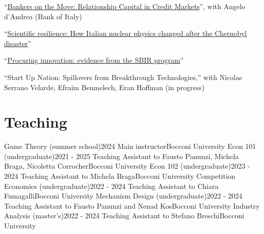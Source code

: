 \documentclass[A4,11pt]{article}
\newcommand{\CVSubHeadingListStart}{\begin{itemize}[leftmargin=0.5cm, label={}]}
\newcommand{\CVSubHeadingListEnd}{\end{itemize}}
\begin{document}
\begin{list}{}{\setlength{\leftmargin}{12pt}}
	\item ``\href{https://enrico-stivella.netlify.app/publication/bankersrelocation/}{Bankers on the Move: Relationship Capital in Credit Markets}'', with Angelo d'Andrea (Bank of Italy) \\
	\item ``\href{https://enrico-stivella.netlify.app/publication/nuclearscience/}{Scientific resilience: How Italian nuclear physics changed after the Chernobyl disaster}'' \\
	\item ``\href{https://enrico-stivella.netlify.app/publication/procurementsbir/}{Procuring innovation: evidence from the SBIR program}'' \\
	\item ``Start Up Nation: Spillovers from Breakthrough Technologies,'' with Nicolas Serrano Velarde, Efraim Benmelech, Eran Hoffman (in progress) \\
\end{list}

\section{Teaching}
\CVSubHeadingListStart
\CVSubheading
{Game Theory (summer school)}{2024}
{Main instructor}{Bocconi University}{} 
\CVSubheading
{Econ 101 (undergraduate)}{2021 - 2025}
{Teaching Assistant to Fausto Panunzi, Michela Braga, Nicoletta Corrocher}{Bocconi University}{}
\CVSubheading
{Econ 102 (undergraduate)}{2023 - 2024}
{Teaching Assistant to Michela Braga}{Bocconi University}{}
\CVSubheading
{Competition Economics (undergraduate)}{2022 - 2024}
{Teaching Assistant to Chiara Fumagalli}{Bocconi University}{}
\CVSubheading
{Mechanism Design (undergraduate)}{2022 - 2024}
{Teaching Assistant to Fausto Panunzi and Nenad Kos}{Bocconi University}{}
\CVSubheading
{Industry Analysis (master's)}{2022 - 2024}
{Teaching Assistant to Stefano Breschi}{Bocconi University}{}
\CVSubHeadingListEnd
\end{document}
